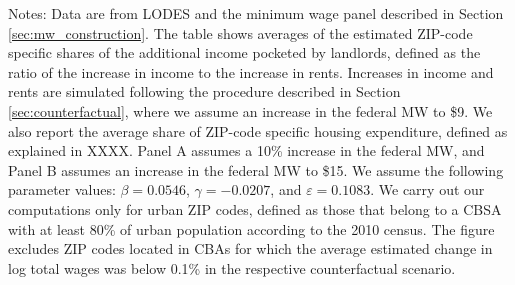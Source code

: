 \begin{table}[hbt!]
    \begin{minipage}{.95\textwidth} \footnotesize
        \vspace{2mm}
        Notes: 
        Data are from LODES and the minimum wage panel described in Section 
        \ref{sec:mw_construction}.
        The table shows averages of the estimated ZIP-code specific shares of the 
        additional income pocketed by landlords, defined as the ratio of the 
        increase in income to the increase in rents. Increases in income and rents are 
        simulated following the procedure described in Section \ref{sec:counterfactual}, 
        where we assume an increase in the federal MW to \$9.
        We also report the average share of ZIP-code specific housing expenditure, 
        defined as explained in XXXX.
        Panel A assumes a 10\% increase in the federal MW, and
        Panel B assumes an increase in the federal MW to \$15.
        We assume the following parameter values:
        $\beta = 0.0546$, $\gamma = -0.0207$, and $\varepsilon = 0.1083$.
        We carry out our computations only for urban ZIP codes, defined as 
        those that belong to a CBSA with at least 80\% of urban population
        according to the 2010 census.
        The figure excludes ZIP codes located in CBAs for which the average
        estimated change in log total wages was below 0.1\% in the respective
        counterfactual scenario.
    \end{minipage}
\end{table}
